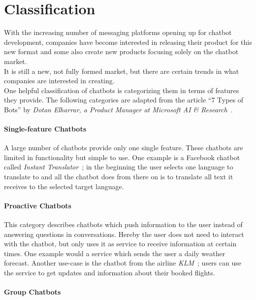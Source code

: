 \section{Classification}
\label{classification}


With the increasing number of messaging platforms opening up for chatbot development,
companies have become interested in releasing their product for this new format and some also create new products focusing solely on the chatbot market.
\\

It is still a new, not fully formed market, but there are certain trends in what companies are interested in creating.
\\

One helpful classification of chatbots is categorizing them in terms of features they provide.
The following categories are adapted from the article ``7 Types of Bots'' by \emph{Dotan Elharrar, a Product Manager at Microsoft AI \& Research}~\cite{bottypes}.


\paragraph{Single-feature Chatbots}

A large number of chatbots provide only one single feature.
These chatbots are limited in functionality but simple to use.
One example is a Facebook chatbot called \emph{Instant Translator}~\cite{instanttranslator};
in the beginning the user selects one language to translate to and all the chatbot does from there on is to translate all text it receives to the selected target language.


\paragraph{Proactive Chatbots}

This category describes chatbots which push information to the user instead of answering questions in conversations.
Hereby the user does not need to interact with the chatbot, but only uses it as service to receive information at certain times.
One example would a service which sends the user a daily weather forecast.
Another use-case is the chatbot from the airline \emph{KLM}~\cite{klm}; users can use the service to get updates and information about their booked flights.


\paragraph{Group Chatbots}

